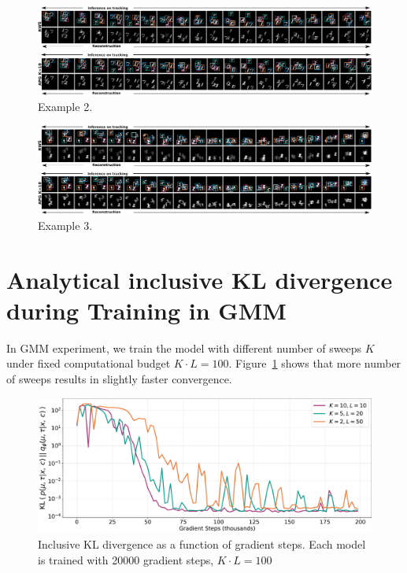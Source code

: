 \documentclass{article}
\theoremstyle{definition}
\begin{document}
\begin{figure}[!h]
\centering
\includegraphics[width=150mm]{figures/bmnist-5digits-samples-with-rws-3.pdf}
\caption{Example 2.}
\end{figure}

\begin{figure}[!h]
\centering
\includegraphics[width=150mm]{figures/bmnist-5digits-samples-with-rws-4.pdf}
\caption{Example 3.}
\end{figure}
\newpage
\section{Analytical inclusive KL divergence during Training in GMM}
\label{appendix-kl-gmm-training}
In GMM experiment, we train the model with different number of sweeps $K$ under fixed computational budget $K \cdot L = 100$. Figure~\ref{fig:kl-training-gmm} shows that more number of sweeps results in slightly faster convergence.
\begin{figure}[!h]
    \centering
    \includegraphics[width=170mm]{figures/kl_training_gmm.pdf}
    \caption{Inclusive KL divergence as a function of gradient steps. Each model is trained with 20000 gradient steps, $K\cdot L=100$}
    \label{fig:kl-training-gmm}
\end{figure}
\end{document}
